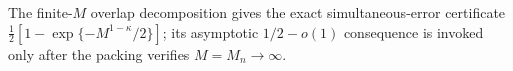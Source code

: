 The finite-\(M\) overlap decomposition gives the exact simultaneous-error certificate \(\frac12[1-\exp\{-M^{1-\kappa}/2\}]\); its asymptotic \(1/2-o(1)\) consequence is invoked only after the packing verifies \(M=M_n\to\infty\).